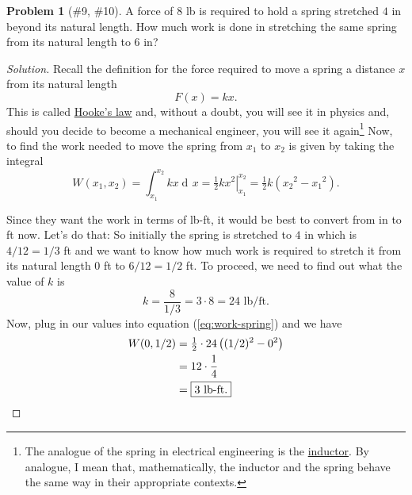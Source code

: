 \documentclass{article}
\theoremstyle{plain}
\theoremstyle{definition}
\newtheorem{problem}[exercise]{Problem}
\theoremstyle{remark}
\DeclareMathOperator{\diff}{d\!}
\begin{document}
\begin{problem}[{\color{Green}\#9}, {\color{Red}\#10}]
A force of $8$ lb is required to hold a spring stretched $4$ in beyond its
natural length. How much work is done in stretching the same spring from
its natural length to $6$ in?
\end{problem}
\begin{proof}[Solution]
Recall the definition for the force required to move a spring a distance
$x$ from its natural length
\begin{equation}
\label{eq:hookes-law}
F(x)=kx.
\end{equation}
This is called \href{https://en.wikipedia.org/wiki/Hooke's_law}{Hooke's
  law} and, without a doubt, you will see it in physics and, should you
decide to become a mechanical engineer, you will see it again\footnote{The
  analogue of the spring in electrical engineering is the
  \href{https://en.wikipedia.org/wiki/Inductor}{inductor}. By analogue, I
  mean that, mathematically, the inductor and the spring behave the same
  way in their appropriate contexts.} Now, to find the work needed to move
the spring from $x_1$ to $x_2$ is given by taking the integral
\begin{equation}
  \label{eq:work-spring}
W(x_1,x_2)=\int_{x_1}^{x_2}kx\diff x=\left.\tfrac{1}{2}kx^2\right|_{x_1}^{x_2}=\tfrac{1}{2}k\left({x_2}^2-{x_1}^2\right).
\end{equation}

Since they want the work in terms of lb-ft, it would be best to convert
from in to ft now. Let's do that: So initially the spring is stretched to
$4$ in which is $4/12=1/3$ ft and we want to know how much work is required
to stretch it from its natural length $0$ ft to $6/12=1/2$ ft. To proceed,
we need to find out what the value of $k$ is
\[
k=\frac{8}{1/3}=3\cdot 8=\text{$24$ lb$/$ft}.
\]
Now, plug in our values into equation (\ref{eq:work-spring}) and we have
\begin{align*}
W(0,1/2)&=\tfrac{1}{2}\cdot 24\left((1/2)^2-0^2\right)\\
&=12\cdot\frac{1}{4}\\
&=\boxed{3\text{ lb-ft}.}\qedhere
\end{align*}
\end{proof}
\end{document}
